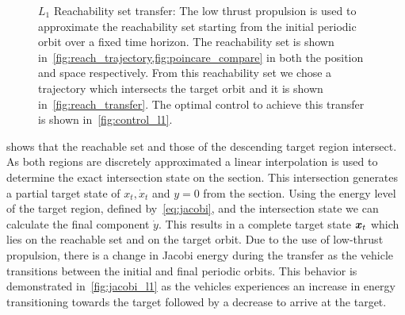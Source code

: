 \documentclass[smallcondensed]{svjour3}
\begin{document}
\begin{figure}
        \caption{\( L_1 \) Reachability set transfer: The low thrust propulsion is used to approximate the reachability set starting from the initial periodic orbit over a fixed time horizon.
            The reachability set is shown in~\cref{fig:reach_trajectory,fig:poincare_compare} in both the position and \Poincare space respectively.
            From this reachability set we chose a trajectory which intersects the target orbit and it is shown in~\cref{fig:reach_transfer}.
        The optimal control to achieve this transfer is shown in~\cref{fig:control_l1}.}
        \label{fig:reachability_set_transfer} 
\end{figure}

 shows that the reachable set and those of the descending target region intersect.
As both regions are discretely approximated a linear interpolation is used to determine the exact intersection state on the \Poincare section.
This intersection generates a partial target state of \( x_t, \dot{x}_t \) and \( y = 0 \) from the \Poincare section.
Using the energy level of the target region, defined by~\cref{eq:jacobi}, and the intersection state we can calculate the final component \( \dot{y} \). 
This results in a complete target state \( \bm{x}_t \) which lies on the reachable set and on the target orbit. 
Due to the use of low-thrust propulsion, there is a change in Jacobi energy during the transfer as the vehicle transitions between the initial and final periodic orbits. 
This behavior is demonstrated in~\cref{fig:jacobi_l1} as the vehicles experiences an increase in energy transitioning towards the target followed by a decrease to arrive at the target.
\end{document}
